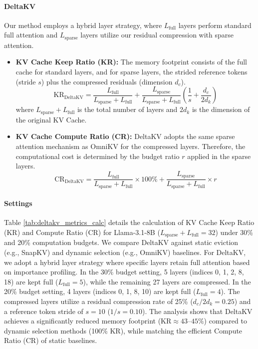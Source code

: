 \paragraph{DeltaKV}
Our method employs a hybrid layer strategy, where $L_{\text{full}}$ layers perform standard full attention and $L_{\text{sparse}}$ layers utilize our residual compression with sparse attention.
\begin{itemize}[nolistsep, left=0pt]
  \item \textbf{KV Cache Keep Ratio (KR):} The memory footprint consists of the full cache for standard layers, and for sparse layers, the strided reference tokens (stride $s$) plus the compressed residuals (dimension $d_c$).
  \begin{equation}
    \text{KR}_{\text{DeltaKV}} = \frac{L_{\text{full}}}{L_{\text{sparse}}+L_{\text{full}}} + \frac{L_{\text{sparse}}}{L_{\text{sparse}}+L_{\text{full}}} \left( \frac{1}{s} + \frac{d_c}{2d_k} \right)
  \end{equation}
  where $L_{\text{sparse}}+L_{\text{full}}$ is the total number of layers and $2d_k$ is the dimension of the original KV Cache.

  \item \textbf{KV Cache Compute Ratio (CR):} DeltaKV adopts the same sparse attention mechanism as OmniKV for the compressed layers. Therefore, the computational cost is determined by the budget ratio $r$ applied in the sparse layers.
  \begin{equation}
    \text{CR}_{\text{DeltaKV}} = \frac{L_{\text{full}}}{L_{\text{sparse}}+L_{\text{full}}} \times 100\% + \frac{L_{\text{sparse}}}{L_{\text{sparse}}+L_{\text{full}}} \times r
  \end{equation}
\end{itemize}



\paragraph{Settings}
Table \ref{tab:deltakv_metrics_calc} details the calculation of KV Cache Keep Ratio (KR) and Compute Ratio (CR) for Llama-3.1-8B ($L_{\text{sparse}}+L_{\text{full}}=32$) under 30\% and 20\% computation budgets. We compare DeltaKV against static eviction (e.g., SnapKV) and dynamic selection (e.g., OmniKV) baselines. For DeltaKV, we adopt a hybrid layer strategy where specific layers retain full attention based on importance profiling. In the 30\% budget setting, 5 layers (indices 0, 1, 2, 8, 18) are kept full ($L_{\text{full}}=5$), while the remaining 27 layers are compressed. In the 20\% budget setting, 4 layers (indices 0, 1, 8, 10) are kept full ($L_{\text{full}}=4$). The compressed layers utilize a residual compression rate of 25\% ($d_c/2d_k = 0.25$) and a reference token stride of $s=10$ ($1/s=0.10$). The analysis shows that DeltaKV achieves a significantly reduced memory footprint ($\text{KR} \approx 43\text{--}45\%$) compared to dynamic selection methods (100\% KR), while matching the efficient Compute Ratio (CR) of static baselines.


